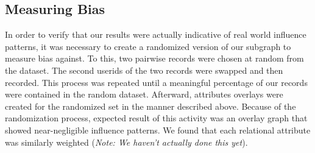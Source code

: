 \subsection{Measuring Bias}
In order to verify that our results were actually indicative of real world influence patterns, it was necessary to create a randomized version of our subgraph to measure bias against.  To this, two pairwise records were chosen at random from the dataset.  The second userids of the two records were swapped and then recorded.  This process was repeated until a meaningful percentage of our records were contained in the random dataset.  Afterward, attributes overlays were created for the randomized set in the manner described above.  Because of the randomization process, expected result of this activity was an overlay graph that showed near-negligible influence patterns.  We found that each relational attribute was similarly weighted (\textit{Note: We haven't actually done this yet}).